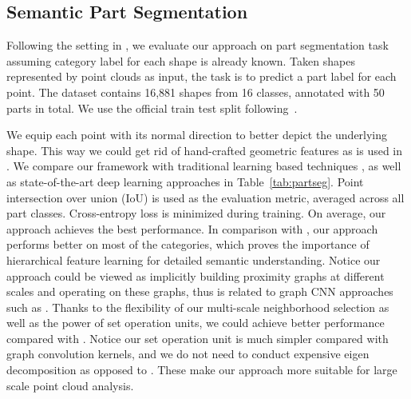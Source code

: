 \documentclass{article}
\begin{document}
\subsection{Semantic Part Segmentation}
Following the setting in \cite{Yi16}, we evaluate our approach on part segmentation task assuming category label for each shape is already known. Taken shapes represented by point clouds as input, the task is to predict a part label for each point. The dataset contains 16,881 shapes from 16 classes, annotated with 50 parts in total. We use the official train test split following~\cite{shapenet2015}.

We equip each point with its normal direction to better depict the underlying shape. This way we could get rid of hand-crafted geometric features as is used in \cite{Yi16,yi2016syncspeccnn}. 
We compare our framework with traditional learning based techniques \cite{Yi16}, as well as state-of-the-art deep learning approaches \cite{qi2016pointnet,yi2016syncspeccnn} in Table~\ref{tab:partseg}. Point intersection over union (IoU) is used as the evaluation metric, averaged across all part classes. Cross-entropy loss is minimized during training. On average, our approach achieves the best performance. In comparison with \cite{qi2016pointnet}, our approach performs better on most of the categories, which proves the importance of hierarchical feature learning for detailed semantic understanding. Notice our approach could be viewed as implicitly building proximity graphs at different scales and operating on these graphs, thus is related to graph CNN approaches such as \cite{yi2016syncspeccnn}. Thanks to the flexibility of our multi-scale neighborhood selection as well as the power of set operation units, we could achieve better performance compared with \cite{yi2016syncspeccnn}. Notice our set operation unit is much simpler compared with graph convolution kernels, and we do not need to conduct expensive eigen decomposition as opposed to \cite{yi2016syncspeccnn}. These make our approach more suitable for large scale point cloud analysis.
\end{document}
